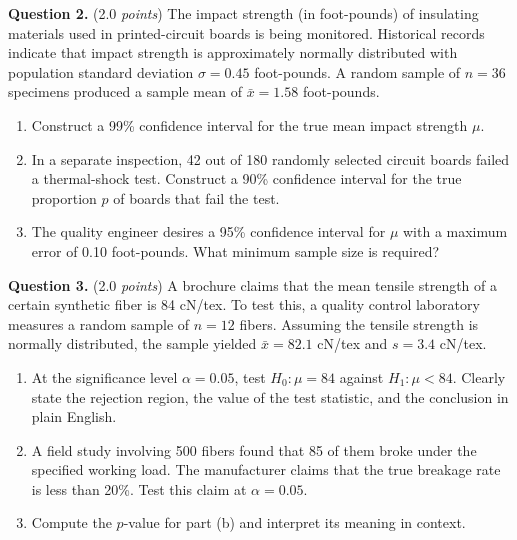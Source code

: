 \documentclass[12pt]{article}
\begin{document}
\textbf{Question 2.} (2.0 \emph{points})
The impact strength (in foot-pounds) of insulating materials used in
printed-circuit boards is being monitored. Historical records indicate
that impact strength is approximately normally distributed with
population standard deviation $\sigma = 0.45$ foot-pounds. A random
sample of $n = 36$ specimens produced a sample mean of
$\bar{x} = 1.58$ foot-pounds.
\begin{enumerate}[label=(\alph*),leftmargin=*]
  \item Construct a 99\% confidence interval for the true mean
        impact strength $\mu$.
  \item In a separate inspection, 42 out of 180 randomly selected
        circuit boards failed a thermal-shock test. Construct a
        90\% confidence interval for the true proportion $p$ of
        boards that fail the test.
  \item The quality engineer desires a 95\% confidence interval for
        $\mu$ with a maximum error of 0.10 foot-pounds. What
        minimum sample size is required?
\end{enumerate}

\textbf{Question 3.} (2.0 \emph{points})
A brochure claims that the mean tensile strength of a certain synthetic
fiber is 84 cN/tex. To test this, a quality control laboratory
measures a random sample of $n = 12$ fibers. Assuming the tensile
strength is normally distributed, the sample yielded
$\bar{x} = 82.1$ cN/tex and $s = 3.4$ cN/tex.
\begin{enumerate}[label=(\alph*),leftmargin=*]
  \item At the significance level $\alpha = 0.05$, test
        $H_0: \mu = 84$ against $H_1: \mu < 84$.
        Clearly state the rejection region, the value of the test
        statistic, and the conclusion in plain English.
  \item A field study involving 500 fibers found that 85 of them
        broke under the specified working load. The manufacturer
        claims that the true breakage rate is less than 20\%.
        Test this claim at $\alpha = 0.05$.
  \item Compute the $p$-value for part (b) and interpret its meaning
        in context.
\end{enumerate}
\end{document}
